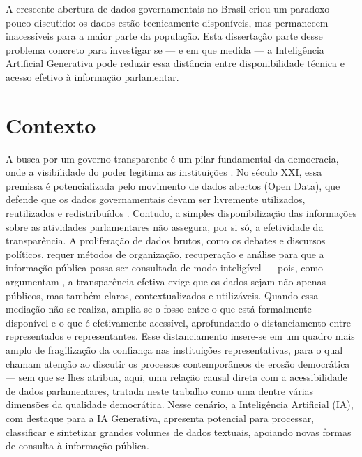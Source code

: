 A crescente abertura de dados governamentais no Brasil criou um paradoxo pouco discutido: os dados estão tecnicamente disponíveis, mas permanecem inacessíveis para a maior parte da população. Esta dissertação parte desse problema concreto para investigar se — e em que medida — a Inteligência Artificial Generativa pode reduzir essa distância entre disponibilidade técnica e acesso efetivo à informação parlamentar.

\section{Contexto}
A busca por um governo transparente é um pilar fundamental da democracia, onde a visibilidade do poder legitima as instituições \cite{Bobbio1986}. No século XXI, essa premissa é potencializada pelo movimento de dados abertos (Open Data), que defende que os dados governamentais devam ser livremente utilizados, reutilizados e redistribuídos \cite{OKBrasil2024}. Contudo, a simples disponibilização das informações sobre as atividades parlamentares não assegura, por si só, a efetividade da transparência. A proliferação de dados brutos, como os debates e discursos políticos, requer métodos de organização, recuperação e análise para que a informação pública possa ser consultada de modo inteligível — pois, como argumentam , a transparência efetiva exige que os dados sejam não apenas públicos, mas também claros, contextualizados e utilizáveis. Quando essa mediação não se realiza, amplia-se o fosso entre o que está formalmente disponível e o que é efetivamente acessível, aprofundando o distanciamento entre representados e representantes. Esse distanciamento insere-se em um quadro mais amplo de fragilização da confiança nas instituições representativas, para o qual  chamam atenção ao discutir os processos contemporâneos de erosão democrática --- sem que se lhes atribua, aqui, uma relação causal direta com a acessibilidade de dados parlamentares, tratada neste trabalho como uma dentre várias dimensões da qualidade democrática. Nesse cenário, a Inteligência Artificial (IA), com destaque para a IA Generativa, apresenta potencial para processar, classificar e sintetizar grandes volumes de dados textuais, apoiando novas formas de consulta à informação pública.

